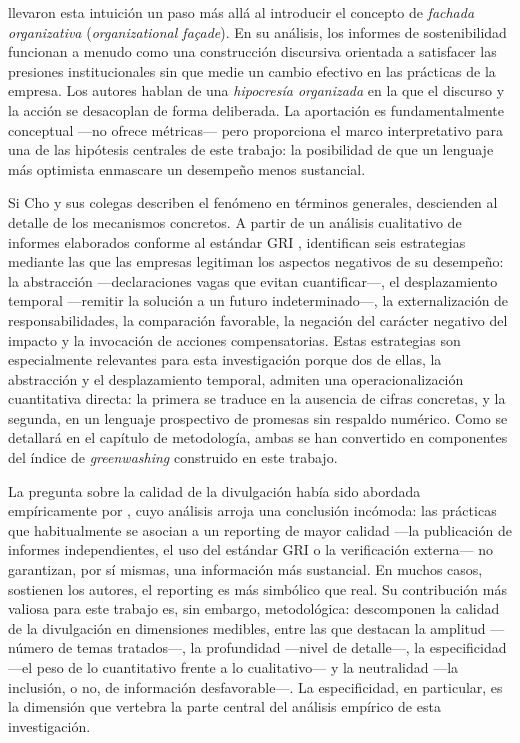\textcite{cho2015} llevaron esta intuición un paso más allá al introducir el concepto de
\textit{fachada organizativa} (\textit{organizational façade}). En su análisis, los informes
de sostenibilidad funcionan a menudo como una construcción discursiva orientada a satisfacer
las presiones institucionales sin que medie un cambio efectivo en las prácticas de la empresa.
Los autores hablan de una \textit{hipocresía organizada} en la que el discurso y la acción se
desacoplan de forma deliberada. La aportación es fundamentalmente conceptual —no ofrece
métricas— pero proporciona el marco interpretativo para una de las hipótesis centrales de este
trabajo: la posibilidad de que un lenguaje más optimista enmascare un desempeño menos
sustancial.

Si Cho y sus colegas describen el fenómeno en términos generales, \textcite{hahn2014}
descienden al detalle de los mecanismos concretos. A partir de un análisis cualitativo de
informes elaborados conforme al estándar GRI \parencite{gri2021}, identifican seis estrategias mediante las que
las empresas legitiman los aspectos negativos de su desempeño: la abstracción —declaraciones
vagas que evitan cuantificar—, el desplazamiento temporal —remitir la solución a un futuro
indeterminado—, la externalización de responsabilidades, la comparación favorable, la negación
del carácter negativo del impacto y la invocación de acciones compensatorias. Estas estrategias
son especialmente relevantes para esta investigación porque dos de ellas, la abstracción y el
desplazamiento temporal, admiten una operacionalización cuantitativa directa: la primera se
traduce en la ausencia de cifras concretas, y la segunda, en un lenguaje prospectivo de
promesas sin respaldo numérico. Como se detallará en el capítulo de metodología, ambas se han
convertido en componentes del índice de \textit{greenwashing} construido en este trabajo.

La pregunta sobre la calidad de la divulgación había sido abordada empíricamente por
\textcite{michelon2015}, cuyo análisis arroja una conclusión incómoda: las prácticas que
habitualmente se asocian a un reporting de mayor calidad —la publicación de informes
independientes, el uso del estándar GRI o la verificación externa— no garantizan, por sí
mismas, una información más sustancial. En muchos casos, sostienen los autores, el reporting es
más simbólico que real. Su contribución más valiosa para este trabajo es, sin embargo,
metodológica: descomponen la calidad de la divulgación en dimensiones medibles, entre las que
destacan la amplitud —número de temas tratados—, la profundidad —nivel de detalle—, la
especificidad —el peso de lo cuantitativo frente a lo cualitativo— y la neutralidad —la
inclusión, o no, de información desfavorable—. La especificidad, en particular, es la dimensión
que vertebra la parte central del análisis empírico de esta investigación.

